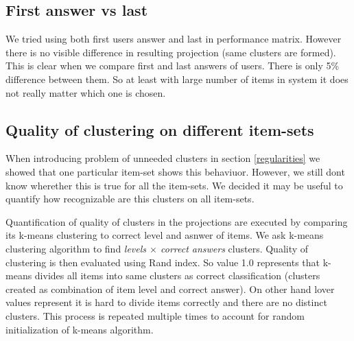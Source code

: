 \documentclass[
  digital, %
  table,   %
  nolof,     %
  nolot,     %
  nocover
]{fithesis3}
\begin{document}
\subsection{First answer vs last}

We tried using both first users answer and last in performance matrix.
However there is no visible difference in resulting projection (same
clusters are formed). This is clear when we compare first and last
answers of users. There is only 5\% difference between them. So at least
with large number of items in system it does not really matter which one
is chosen.

\subsection{Quality of clustering on different item-sets}

When introducing problem of unneeded clusters in section \ref{regularities} we showed that one particular item-set shows this behaviuor. However, we still dont know wherether this is true for all the item-sets. We decided it may be useful to quantify how recognizable are this clusters on all item-sets.


Quantification of quality of clusters in the projections are executed by comparing its k-means clustering to correct level and asnwer of items. We ask k-means clustering algorithm to find \textit{levels $\times$ correct answers} clusters. Quality of clustering is then evaluated using Rand index. So value 1.0 represents that k-means divides all items into same clusters as correct classification (clusters created as combination of item level and correct answer). On other hand lover values represent it is hard to divide items correctly and there are no distinct clusters. This process is repeated multiple times to account for random initialization of k-means algorithm.
\end{document}
